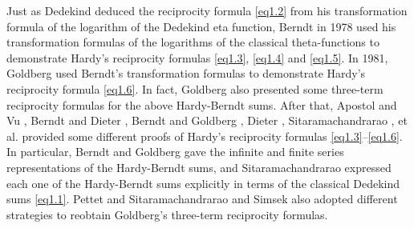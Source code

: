 \documentclass[reqno]{amsart}
\numberwithin{equation}{section}
\begin{document}
Just as Dedekind \cite{dedekind} deduced the reciprocity formula \eqref{eq1.2} from his transformation formula of the logarithm of the Dedekind eta function, Berndt \cite{berndt2} in 1978 used his transformation formulas of the logarithms of the classical theta-functions to demonstrate Hardy's reciprocity formulas \eqref{eq1.3}, \eqref{eq1.4} and \eqref{eq1.5}. In 1981, Goldberg \cite{goldberg} used Berndt's \cite{berndt2} transformation formulas to demonstrate Hardy's reciprocity formula \eqref{eq1.6}. In fact, Goldberg \cite{goldberg} also presented some three-term reciprocity formulas for the above Hardy-Berndt sums. After that, Apostol and Vu \cite{apostol2}, Berndt and Dieter \cite{berndt3}, Berndt and Goldberg \cite{berndt4}, Dieter \cite{dieter}, Sitaramachandrarao \cite{sitaramachandrarao}, et al. provided some different proofs of Hardy's reciprocity formulas \eqref{eq1.3}--\eqref{eq1.6}. In particular, Berndt and Goldberg \cite{berndt4} gave the infinite and finite series representations of the Hardy-Berndt sums, and Sitaramachandrarao \cite{sitaramachandrarao} expressed each one of the Hardy-Berndt sums explicitly in terms of the classical Dedekind sums \eqref{eq1.1}. Pettet and Sitaramachandrarao \cite{pettet} and Simsek \cite{simsek} also adopted different strategies to reobtain Goldberg's \cite{goldberg} three-term reciprocity formulas.
\end{document}
